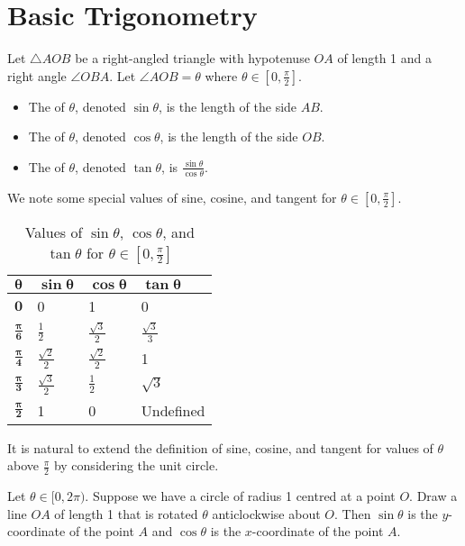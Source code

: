 \section{Basic Trigonometry}
\begin{definition}
    Let $\triangle AOB$ be a right-angled triangle with hypotenuse $OA$ of length 1 and a right angle $\angle OBA$. Let $\angle AOB = \theta$ where $\theta \in [0, \frac\pi2]$.
    \begin{itemize}
        \item The  of $\theta$, denoted $\sin\theta$, is the length of the side $AB$.
        \item The  of $\theta$, denoted $\cos\theta$, is the length of the side $OB$.
        \item The  of $\theta$, denoted $\tan\theta$, is $\frac{\sin\theta}{\cos\theta}$.
    \end{itemize}
\end{definition}

We note some special values of sine, cosine, and tangent for $\theta \in [0, \frac\pi2]$.

\begin{table}[H]
    \centering
    \begin{tabular}{|l|l|l|l|}
        \hline
        $\boldsymbol{\theta}$ & $\boldsymbol{\sin\theta}$ & $\boldsymbol{\cos\theta}$ & $\boldsymbol{\tan\theta}$ \\ \hline
        $\boldsymbol{0}$ & 0 & 1 & 0 \\ \hline
        $\boldsymbol{\frac\pi6}$ & $\frac12$ & $\frac{\sqrt3}2$ & $\frac{\sqrt3}3$ \\ \hline
        $\boldsymbol{\frac\pi4}$ & $\frac{\sqrt2}2$ & $\frac{\sqrt2}2$ & 1 \\ \hline
        $\boldsymbol{\frac\pi3}$ & $\frac{\sqrt3}2$ & $\frac12$ & $\sqrt3$ \\ \hline
        $\boldsymbol{\frac\pi2}$ & 1 & 0 & Undefined \\ \hline
    \end{tabular}
    \caption{Values of $\sin\theta$, $\cos\theta$, and $\tan\theta$ for $\theta \in [0, \frac\pi2]$}
\end{table}

It is natural to extend the definition of sine, cosine, and tangent for values of $\theta$ above $\frac\pi2$ by considering the unit circle.

\begin{definition}
    Let $\theta \in [0, 2\pi)$. Suppose we have a circle of radius 1 centred at a point $O$. Draw a line $OA$ of length 1 that is rotated $\theta$ anticlockwise about $O$. Then $\sin\theta$ is the $y$-coordinate of the point $A$ and  $\cos\theta$ is the $x$-coordinate of the point $A$.
\end{definition}

